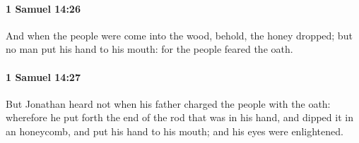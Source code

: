 		\paragraph{1 Samuel 14:26} %
			\label{1SAMUEL-14-26}

			And when the people were come into the wood, behold, the honey dropped; but no man put his hand to his mouth: for the people feared the oath.


		\paragraph{1 Samuel 14:27} %
			\label{1SAMUEL-14-27}

			But Jonathan heard not when his father charged the people with the oath: wherefore he put forth the end of the rod that was in his hand, and dipped it in an honeycomb, and put his hand to his mouth; and his eyes were enlightened.

